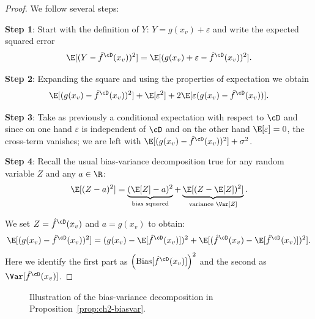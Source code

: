 \begin{proof}
We follow several steps:

\textbf{Step 1}: Start with the definition of $Y$: $Y = g(x_v) + \varepsilon$ and write the expected
squared error
\[
\E[(Y - \hat{f}^{\cD}(x_v))^2] = \E[(g(x_v) + \varepsilon - \hat{f}^{\cD}(x_v))^2].
\]

\textbf{Step 2}: Expanding the square and using the properties of expectation we
obtain
\[
\E[(g(x_v) - \hat{f}^{\cD}(x_v))^2] + \E[\varepsilon^2] + 2\E[\varepsilon(g(x_v) - \hat{f}^{\cD}(x_v))].
\]

\textbf{Step 3}: Take as previously a conditional expectation with respect to $\cD$ and
since on one hand $\varepsilon$ is independent of $\cD$ and on the other hand $\E[\varepsilon] = 0$,
the cross-term vanishes; we are left with $\E[(g(x_v) - \hat{f}^{\cD}(x_v))^2] + \sigma^2$.

\textbf{Step 4}: Recall the usual bias-variance decomposition true for any random
variable $Z$ and any $a \in \R$:
\begin{equation}\label{eq:ch2-bvgeneric}
\E[(Z - a)^2] = \underbrace{(\E[Z] - a)^2}_{\text{bias squared}} + \underbrace{\E[(Z - \E[Z])^2]}_{\text{variance } \Var[Z]}.
\end{equation}

We set $Z = \hat{f}^{\cD}(x_v)$ and $a = g(x_v)$ to obtain:
\begin{equation}\label{eq:ch2-biasvarfinal}
\E[(g(x_v) - \hat{f}^{\cD}(x_v))^2] = (g(x_v) - \E[\hat{f}^{\cD}(x_v)])^2 + \E[(\hat{f}^{\cD}(x_v) - \E[\hat{f}^{\cD}(x_v)])^2].
\end{equation}
Here we identify the first part as $\left(\mathrm{Bias}[\hat{f}^{\cD}(x_v)]\right)^2$ and the second as
$\Var[\hat{f}^{\cD}(x_v)]$.
\end{proof}

\begin{figure}[h]\centering
\caption{Illustration of the bias-variance decomposition in Proposition~\ref{prop:ch2-biasvar}.}
\label{fig:ch2-biasvar}
\end{figure}

